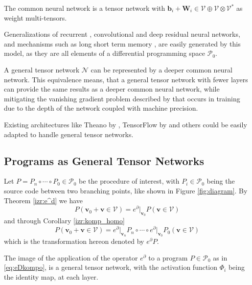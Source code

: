 \documentclass[11pt]{article}
\newcommand{\bfW}{\mathbf{W}}
\newcommand{\VV}{\mathcal{V}}
\newcommand{\NN}{\mathcal{N}}
\newcommand{\vv}{\mathbf{v}}
\newcommand{\dP}{\mathcal{P}}
\newcommand{\D}{\partial}
\begin{document}
\begin{remark}
  The common neural network is a tensor network with $\mathbf{b}_i+\bfW_i\in
  \VV\oplus \VV\otimes \VV^*$ as weight multi-tensors.
\end{remark}

Generalizations of recurrent \citep{RecurrentNet}, convolutional \citep{ConvNet} and deep residual \citep{resNet} neural networks, and mechanisms such as long short term memory \citep{LSTM}, are easily generated by this model, as they are all elements of a differential programming space $\dP_0$. 
 
A general tensor network $\NN$ can be represented by a deeper
common neural network. This equivalence means, that a general tensor network
with fewer layers can provide the same results as a deeper common neural
network, while mitigating the vanishing gradient problem
described by \cite{VanishingGradient} that occurs in training due to the depth of the network
coupled with machine precision. 

\begin{remark}
Existing architectures like Theano by \cite{Theano}, TensorFlow by \cite{TensorFlow}
and others could be easily adapted to handle general tensor networks.
\end{remark}

\subsection{Programs as General Tensor Networks}\label{sec:progAsNet}

Let $P=P_n\circ\cdots\circ P_0\in\dP_0$ be the procedure of interest, with $P_i\in\dP_0$ being the source code between two branching points, like shown in Figure \ref{fig:diagram}.
By Theorem \ref{izr:e^d} we have
\begin{equation}\label{eq:PGN1}
P(\vv_0+\vv\in \VV)=e^\D\vert_{\vv_0} P(\vv\in \VV)
\end{equation}
and through Corollary \ref{izr:komp_homo}
\begin{equation}\label{eq:eDkompo}
P(\vv_0+\vv\in \VV)=e^\D\vert_{\vv_n} P_n\circ\cdots \circ e^\D\vert_{\vv_0} P_0(\vv\in \VV)
\end{equation}
which is the transformation hereon denoted by $e^\D P$.

\begin{proposition}
The image of the application of the operator $e^\D$ to a program $P\in\dP_0$ as in \eqref{eq:eDkompo}, is a general tensor network, with the activation function $\Phi_i$ being the identity map, at each layer.
\end{proposition}
\end{document}
